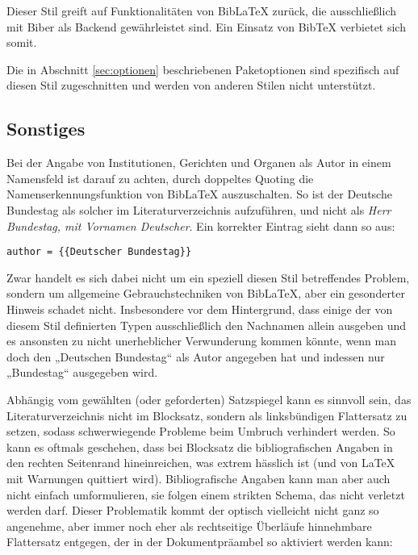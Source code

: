\documentclass[11pt,a4paper,DIV=calc,draft]{scrartcl}
\newcommand\software[1]{\textsf{#1}}
\newcommand\Biblatex{\software{Bib\LaTeX{}}\xspace}
\begin{document}
Dieser Stil greift auf Funktionalitäten von \Biblatex zurück, die
ausschließlich mit \software{Biber} als Backend gewährleistet
sind. Ein Einsatz von \software{Bib\TeX{}} verbietet sich somit.

Die in Abschnitt \ref{sec:optionen} beschriebenen Paketoptionen sind
spezifisch auf diesen Stil zugeschnitten und werden von anderen Stilen
nicht unterstützt.

\subsection{Sonstiges}

Bei der Angabe von Institutionen, Gerichten und Organen als Autor in
einem Namensfeld ist darauf zu achten, durch doppeltes Quoting die
Namenserkennungsfunktion von \Biblatex auszuschalten. So ist der
Deutsche Bundestag als solcher im Literaturverzeichnis aufzuführen,
und nicht als \emph{Herr Bundestag, mit Vornamen Deutscher}. Ein
korrekter Eintrag sieht dann so aus:

\begin{verbatim}
author = {{Deutscher Bundestag}}
\end{verbatim}

Zwar handelt es sich dabei nicht um ein speziell diesen Stil
betreffendes Problem, sondern um allgemeine Gebrauchstechniken von
\Biblatex, aber ein gesonderter Hinweis schadet nicht. Insbesondere
vor dem Hintergrund, dass einige der von diesem Stil definierten Typen
ausschließlich den Nachnamen allein ausgeben und es ansonsten zu nicht
unerheblicher Verwunderung kommen könnte, wenn man doch den „Deutschen
Bundestag“ als Autor angegeben hat und indessen nur „Bundestag“ ausgegeben
wird.

Abhängig vom gewählten (oder geforderten) Satzspiegel kann es sinnvoll
sein, das Literaturverzeichnis nicht im Blocksatz, sondern als
linksbündigen Flattersatz zu setzen, sodass schwerwiegende Probleme
beim Umbruch verhindert werden. So kann es oftmals geschehen, dass bei
Blocksatz die bibliografischen Angaben in den rechten Seitenrand
hineinreichen, was extrem hässlich ist (und von \LaTeX{} mit Warnungen
quittiert wird). Bibliografische Angaben kann man aber auch nicht
einfach umformulieren, sie folgen einem strikten Schema, das nicht
verletzt werden darf. Dieser Problematik kommt der optisch vielleicht
nicht ganz so angenehme, aber immer noch eher als rechtseitige
Überläufe hinnehmbare Flattersatz entgegen, der in der
Dokumentpräambel so aktiviert werden kann:
\end{document}
